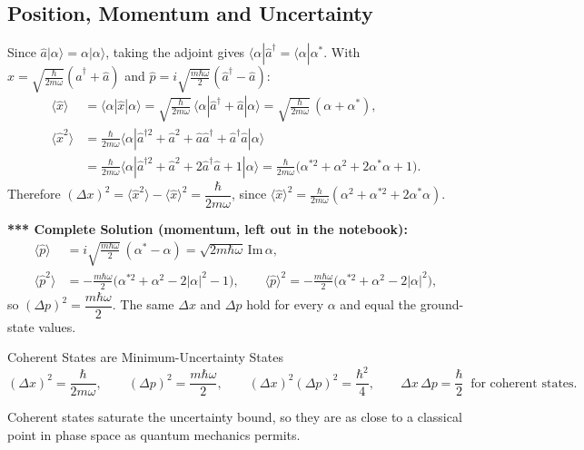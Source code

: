 \documentclass[11pt,a4paper]{article}
\begin{document}
\subsection{Position, Momentum and Uncertainty}
Since $\hat a|\alpha\rangle=\alpha|\alpha\rangle$, taking the adjoint gives $\langle\alpha|\hat a^\dagger=\langle\alpha|\alpha^*$. With $\hat x=\sqrt{\frac\hbar{2m\omega}}(\hat a^\dagger+\hat a)$ and $\hat p=i\sqrt{\frac{m\hbar\omega}2}(\hat a^\dagger-\hat a)$:
\begin{align*}
\langle\hat x\rangle&=\langle\alpha|\hat x|\alpha\rangle=\sqrt{\frac\hbar{2m\omega}}\,\langle\alpha|\hat a^\dagger+\hat a|\alpha\rangle=\sqrt{\frac\hbar{2m\omega}}\,(\alpha+\alpha^*),\\
\langle\hat x^2\rangle&=\frac\hbar{2m\omega}\langle\alpha|\hat a^{\dagger2}+\hat a^2+\hat a\hat a^\dagger+\hat a^\dagger\hat a|\alpha\rangle\\
&=\frac\hbar{2m\omega}\langle\alpha|\hat a^{\dagger2}+\hat a^2+2\hat a^\dagger\hat a+1|\alpha\rangle
=\frac\hbar{2m\omega}\big(\alpha^{*2}+\alpha^2+2\alpha^*\alpha+1\big).
\end{align*}
Therefore $(\Delta x)^2=\langle\hat x^2\rangle-\langle\hat x\rangle^2=\dfrac\hbar{2m\omega}$, since $\langle\hat x\rangle^2=\frac\hbar{2m\omega}(\alpha^2+\alpha^{*2}+2\alpha^*\alpha)$.

\textbf{*** Complete Solution (momentum, left out in the notebook):}
\begin{align*}
\langle\hat p\rangle&=i\sqrt{\tfrac{m\hbar\omega}2}\,(\alpha^*-\alpha)=\sqrt{2m\hbar\omega}\,\mathrm{Im}\,\alpha,\\
\langle\hat p^2\rangle&=-\frac{m\hbar\omega}2\big(\alpha^{*2}+\alpha^2-2|\alpha|^2-1\big),\qquad
\langle\hat p\rangle^2=-\frac{m\hbar\omega}2\big(\alpha^{*2}+\alpha^2-2|\alpha|^2\big),
\end{align*}
so $(\Delta p)^2=\dfrac{m\hbar\omega}2$. The same $\Delta x$ and $\Delta p$ hold for every $\alpha$ and equal the ground-state values.

\begin{thm}{Coherent States are Minimum-Uncertainty States}
\[
(\Delta x)^2=\frac\hbar{2m\omega},\qquad(\Delta p)^2=\frac{m\hbar\omega}2,\qquad(\Delta x)^2(\Delta p)^2=\frac{\hbar^2}4,\qquad
\boxed{\Delta x\,\Delta p=\frac\hbar2}\ \text{ for coherent states.}
\]
\end{thm}
Coherent states saturate the uncertainty bound, so they are as close to a classical point in phase space as quantum mechanics permits.
\end{document}
